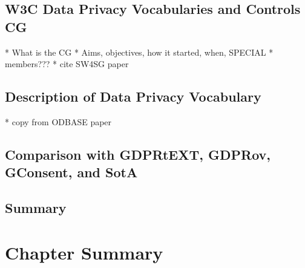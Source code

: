 \subsection{W3C Data Privacy Vocabularies and Controls CG}
* What is the CG
* Aims, objectives, how it started, when, SPECIAL
* members???
* cite SW4SG paper

\subsection{Description of Data Privacy Vocabulary}
* copy from ODBASE paper

\subsection{Comparison with GDPRtEXT, GDPRov, GConsent, and SotA}

\subsection*{Summary}

\section{Chapter Summary}